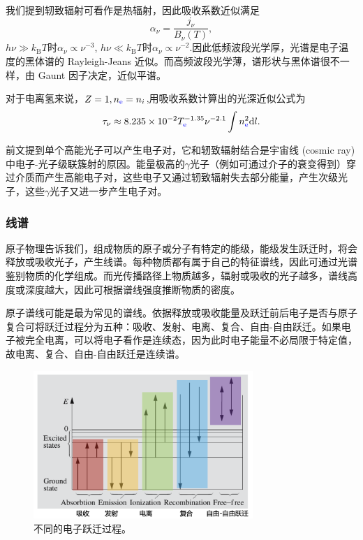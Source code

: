 \documentclass[../天体物理基础.tex]{subfiles}
\begin{document}
我们提到轫致辐射可看作是热辐射，因此吸收系数近似满足
\begin{equation}
\alpha_{\nu}=\frac{j_{\nu}}{B_{\nu}\left(T\right)},
\end{equation}
$h\nu\gg k_{\text{B}}T$时$\alpha_{\nu}\propto{}\nu^{-3}$, $h\nu\ll k_{\text{B}}T$时$\alpha_{\nu}\propto{}\nu^{-2}$.因此低频波段光学厚，光谱是电子温度的黑体谱的 Rayleigh-Jeans 近似。而高频波段光学薄，谱形状与黑体谱很不一样，由 Gaunt 因子决定，近似平谱。

对于电离氢来说，$Z=1,n_{{\color{blue}{\ce{e}}}}=n_{i}$,用吸收系数计算出的光深近似公式为
\begin{equation}
\tau_{\nu}\approx8.235\times10^{-2}T_{{\color{blue}{\ce{e}}}}^{-1.35}\nu^{-2.1}\int n_{{\color{blue}{\ce{e}}}}^{2}\mathrm{d}l.
\end{equation}

前文提到单个高能光子可以产生电子对，它和轫致辐射结合是宇宙线 (cosmic ray) 中电⼦{}-{}光⼦级联簇射的原因。能量极⾼的$\gamma$光⼦（例如可通过介⼦的衰变得到）穿过介质⽽产生⾼能电⼦对，这些电子又通过轫致辐射失去部分能量，产⽣次级光⼦，这些$\gamma$光⼦又进一步产⽣电⼦对。

\subsubsection{线谱}
原子物理告诉我们，组成物质的原子或分子有特定的能级，能级发生跃迁时，将会释放或吸收光子，产生线谱。每种物质都有属于自己的特征谱线，因此可通过光谱鉴别物质的化学组成。而光传播路径上物质越多，辐射或吸收的光子越多，谱线高度或深度越大，因此可根据谱线强度推断物质的密度。

原子谱线可能是最为常见的谱线。依据释放或吸收能量及跃迁前后电子是否与原子复合可将跃迁过程分为五种：吸收、发射、电离、复合、自由{}-{}自由跃迁。如果电子被完全电离，可以将电子看作是连续态，因为此时电子能量不必局限于特定值，故电离、复合、自由{}-{}自由跃迁是连续谱。
\begin{figure}[!htbp]
\centering
\includegraphics[width=8.3cm]{figures/figure1_10.png}
\captionsetup{justification=raggedright, singlelinecheck=false}
\caption{不同的电子跃迁过程。}
\label{不同的电子跃迁过程。}
\end{figure}
\end{document}
